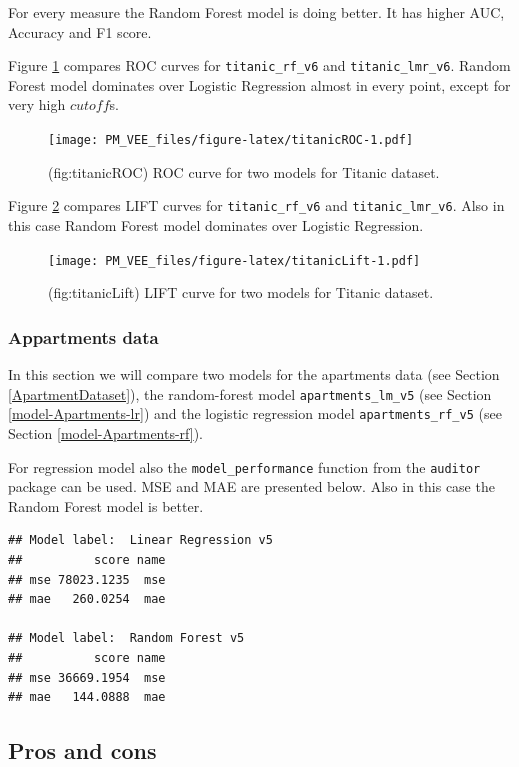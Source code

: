 \documentclass[12pt,]{krantz}
\begin{document}
For every measure the Random Forest model is doing better. It has higher AUC, Accuracy and F1 score.

Figure \ref{fig:titanicROC} compares ROC curves for \texttt{titanic\_rf\_v6} and \texttt{titanic\_lmr\_v6}. Random Forest model dominates over Logistic Regression almost in every point, except for very high \(cutoff\)s.

\begin{figure}
\centering
\texttt{[image: PM\_VEE\_files/figure-latex/titanicROC-1.pdf]}
\caption{\label{fig:titanicROC}(fig:titanicROC) ROC curve for two models for Titanic dataset.}
\end{figure}

Figure \ref{fig:titanicLift} compares LIFT curves for \texttt{titanic\_rf\_v6} and \texttt{titanic\_lmr\_v6}. Also in this case Random Forest model dominates over Logistic Regression.

\begin{figure}
\centering
\texttt{[image: PM\_VEE\_files/figure-latex/titanicLift-1.pdf]}
\caption{\label{fig:titanicLift}(fig:titanicLift) LIFT curve for two models for Titanic dataset.}
\end{figure}

\hypertarget{modelPerformanceApartments}{%
\subsubsection{Appartments data}\label{modelPerformanceApartments}}

In this section we will compare two models for the apartments data (see Section \ref{ApartmentDataset}), the random-forest model \texttt{apartments\_lm\_v5} (see Section \ref{model-Apartments-lr}) and the logistic regression model \texttt{apartments\_rf\_v5} (see Section \ref{model-Apartments-rf}).

For regression model also the \texttt{model\_performance} function from the \texttt{auditor} package can be used. MSE and MAE are presented below. Also in this case the Random Forest model is better.

\begin{verbatim}
## Model label:  Linear Regression v5 
##          score name
## mse 78023.1235  mse
## mae   260.0254  mae

## Model label:  Random Forest v5 
##          score name
## mse 36669.1954  mse
## mae   144.0888  mae
\end{verbatim}

\hypertarget{modelPerformanceProsCons}{%
\subsection{Pros and cons}\label{modelPerformanceProsCons}}
\end{document}
